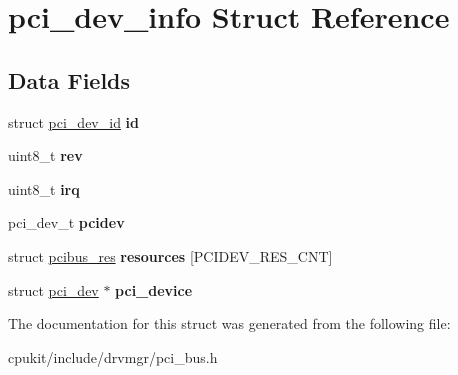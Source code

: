 \hypertarget{structpci__dev__info}{}\section{pci\+\_\+dev\+\_\+info Struct Reference}
\label{structpci__dev__info}
\subsection*{Data Fields}
\begin{DoxyCompactItemize}
\item 
\mbox{\label{structpci__dev__info_a01c2bbdebdbfbaf150efd9ea38685945}} 
struct \mbox{\hyperlink{structpci__dev__id}{pci\+\_\+dev\+\_\+id}} {\bfseries id}
\item 
\mbox{\label{structpci__dev__info_abedd32d99f58690c005532d2bae81277}} 
uint8\+\_\+t {\bfseries rev}
\item 
\mbox{\label{structpci__dev__info_a59402599046c07b181981e0803c210b8}} 
uint8\+\_\+t {\bfseries irq}
\item 
\mbox{\label{structpci__dev__info_aaa608e04d2a8ffb7f817909fa77e8483}} 
pci\+\_\+dev\+\_\+t {\bfseries pcidev}
\item 
\mbox{\label{structpci__dev__info_a791f9f3c8c3d01043460227ec4ca7f52}} 
struct \mbox{\hyperlink{structpcibus__res}{pcibus\+\_\+res}} {\bfseries resources} \mbox{[}P\+C\+I\+D\+E\+V\+\_\+\+R\+E\+S\+\_\+\+C\+NT\mbox{]}
\item 
\mbox{\label{structpci__dev__info_a49c910f2ec78e4493a785e9fad8ed59e}} 
struct \mbox{\hyperlink{structpci__dev}{pci\+\_\+dev}} $\ast$ {\bfseries pci\+\_\+device}
\end{DoxyCompactItemize}


The documentation for this struct was generated from the following file\+:\begin{DoxyCompactItemize}
\item 
cpukit/include/drvmgr/pci\+\_\+bus.\+h\end{DoxyCompactItemize}
